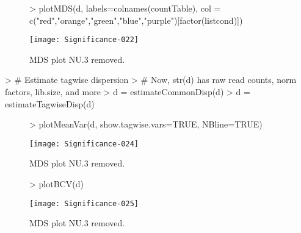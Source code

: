 \documentclass{article}
\begin{document}
\begin{figure}[H]
\centering
\begin{Schunk}
\begin{Sinput}
> plotMDS(d, labels=colnames(countTable), col = c("red","orange","green","blue","purple")[factor(listcond)])
\end{Sinput}
\end{Schunk}
\texttt{[image: Significance-022]}
\caption{MDS plot NU.3 removed.}
\label{MDS-NONU3}
\end{figure}

\begin{Schunk}
\begin{Sinput}
> # Estimate tagwise dispersion
> # Now, str(d) has raw read counts, norm factors, lib.size, and more
> d = estimateCommonDisp(d)
> d = estimateTagwiseDisp(d)
\end{Sinput}
\end{Schunk}

\begin{figure}[H]
\centering
\begin{Schunk}
\begin{Sinput}
> plotMeanVar(d, show.tagwise.vars=TRUE, NBline=TRUE)
\end{Sinput}
\end{Schunk}
\texttt{[image: Significance-024]}
\caption{MDS plot NU.3 removed.}
\label{MeanVarPlot-NONU3}
\end{figure}

\begin{figure}[H]
\centering
\begin{Schunk}
\begin{Sinput}
> plotBCV(d)
\end{Sinput}
\end{Schunk}
\texttt{[image: Significance-025]}
\caption{MDS plot NU.3 removed.}
\label{BCV-NONU3}
\end{figure}
\end{document}
